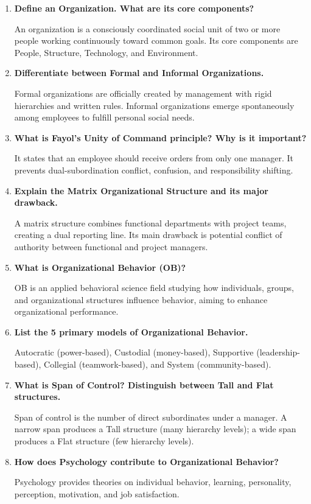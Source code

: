 \documentclass[11pt,a4paper]{article}
\newcommand{\Q}[1]{\textbf{#1}\par\noindent\ignorespaces}
\begin{document}
\begin{tcolorbox}[exambox, title={\textbf{Frequently Asked / Viva Questions}}]
\begin{enumerate}[leftmargin=*, itemsep=4pt]
  \item \Q{Define an Organization. What are its core components?}
    An organization is a consciously coordinated social unit of two or more people working continuously toward common goals. Its core components are People, Structure, Technology, and Environment.
  
  \item \Q{Differentiate between Formal and Informal Organizations.}
    Formal organizations are officially created by management with rigid hierarchies and written rules. Informal organizations emerge spontaneously among employees to fulfill personal social needs.
  
  \item \Q{What is Fayol's Unity of Command principle? Why is it important?}
    It states that an employee should receive orders from only one manager. It prevents dual-subordination conflict, confusion, and responsibility shifting.
  
  \item \Q{Explain the Matrix Organizational Structure and its major drawback.}
    A matrix structure combines functional departments with project teams, creating a dual reporting line. Its main drawback is potential conflict of authority between functional and project managers.
  
  \item \Q{What is Organizational Behavior (OB)?}
    OB is an applied behavioral science field studying how individuals, groups, and organizational structures influence behavior, aiming to enhance organizational performance.
  
  \item \Q{List the 5 primary models of Organizational Behavior.}
    Autocratic (power-based), Custodial (money-based), Supportive (leadership-based), Collegial (teamwork-based), and System (community-based).
  
  \item \Q{What is Span of Control? Distinguish between Tall and Flat structures.}
    Span of control is the number of direct subordinates under a manager. A narrow span produces a Tall structure (many hierarchy levels); a wide span produces a Flat structure (few hierarchy levels).
  
  \item \Q{How does Psychology contribute to Organizational Behavior?}
    Psychology provides theories on individual behavior, learning, personality, perception, motivation, and job satisfaction.
  

\end{enumerate}
\end{tcolorbox}
\end{document}
